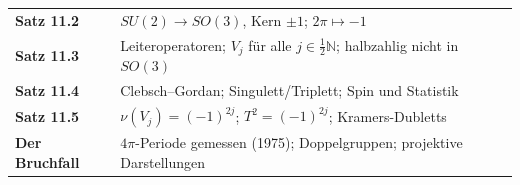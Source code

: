 \begin{merksatz}
\begin{center}
\renewcommand{\arraystretch}{1.5}
\begin{tabular}{@{}P{3.0cm}P{5.6cm}@{}}
\toprule
\textbf{Satz 11.2} & $SU(2)\to SO(3)$, Kern $\pm1$; $2\pi\mapsto-1$\\
\textbf{Satz 11.3} & Leiteroperatoren; $V_j$ für alle $j\in\frac12\mathbb N$; halbzahlig nicht in $SO(3)$\\
\textbf{Satz 11.4} & Clebsch--Gordan; Singulett/Triplett; Spin und Statistik\\
\textbf{Satz 11.5} & $\nu(V_j) = (-1)^{2j}$; $T^{2} = (-1)^{2j}$; Kramers-Dubletts\\
\textbf{Der Bruchfall} & $4\pi$-Periode gemessen (1975); Doppelgruppen; projektive Darstellungen\\
\bottomrule
\end{tabular}
\end{center}

\begin{center}
\begin{minipage}{0.88\textwidth}
\end{minipage}
\end{center}
\end{merksatz}
